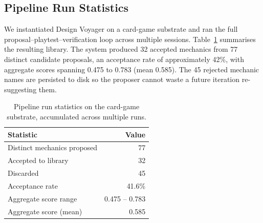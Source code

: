 \documentclass[conference]{IEEEtran}
\begin{document}
 \subsection{Pipeline Run Statistics}                                          
                  
  We instantiated Design Voyager on a card-game substrate and ran the full      
  proposal--playtest--verification loop across multiple sessions.               
  Table~\ref{tab:pipeline_stats} summarises the resulting library. The system
  produced 32 accepted mechanics from 77 distinct candidate proposals, an       
  acceptance rate of approximately 42\%, with aggregate scores spanning 0.475 to
   0.783 (mean 0.585). The 45 rejected mechanic names are persisted to disk so
  the proposer cannot waste a future iteration re-suggesting them.

  \begin{table}[ht!]                                                            
  \centering
  \caption{Pipeline run statistics on the card-game substrate, accumulated      
  across multiple runs.}                                                      
  \label{tab:pipeline_stats}                                         
  \begin{tabular}{|l|r|}                           
  \hline                                       
  \textbf{Statistic} & \textbf{Value} \\
  \hline                       
  Distinct mechanics proposed & 77 \\                                
  \hline                                           
  Accepted to library & 32 \\                                                   
  \hline                                
  Discarded & 45 \\                                                             
  \hline                                                                      
  Acceptance rate & 41.6\% \\                                        
  \hline                                                                        
  Aggregate score range & 0.475 -- 0.783 \\    
  \hline                                                                        
  Aggregate score (mean) & 0.585 \\                                           
  \hline                    
  \end{tabular}                                                      
  \end{table}
\end{document}

